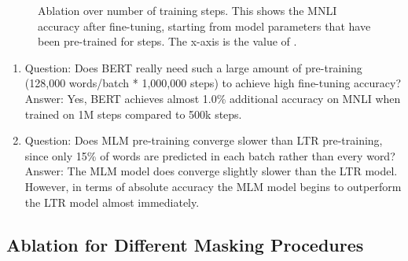 \documentclass[11pt,a4paper]{article}
\newcommand\bertbase{BERT\xspace}
\begin{document}
\begin{figure}[b]
\caption{Ablation over number of training steps. This shows the MNLI accuracy after fine-tuning, starting from model parameters that have been pre-trained for  steps. The x-axis is the value of .}
\label{fig:step_abalation}
\end{figure} 
\begin{enumerate}
\item Question: Does BERT really need such a large amount of pre-training (128,000 words/batch * 1,000,000 steps) to achieve high fine-tuning accuracy? \\
Answer: Yes, \bertbase achieves almost 1.0\% additional accuracy on MNLI when trained on 1M steps compared to 500k steps.
\item Question: Does MLM pre-training converge slower than LTR pre-training, since only 15\% of words are predicted in each batch rather than every word? \\
Answer: The MLM model does converge slightly slower than the LTR model. However, in terms of absolute accuracy the MLM model begins to outperform the LTR model almost immediately.
\end{enumerate}

\subsection{Ablation for Different Masking Procedures}
\label{appendix:sec:different_masks}
\end{document}
